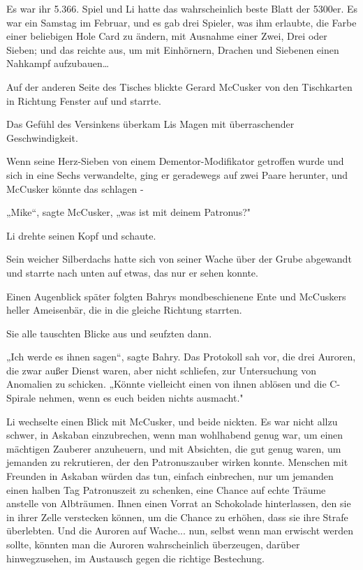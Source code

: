 {Es war ihr 5.366. Spiel und Li hatte das wahrscheinlich beste Blatt der 5300er. Es war ein Samstag im Februar, und es gab drei Spieler, was ihm erlaubte, die Farbe einer beliebigen Hole Card zu ändern, mit Ausnahme einer Zwei, Drei oder Sieben; und das reichte aus, um mit Einhörnern, Drachen und Siebenen einen Nahkampf aufzubauen…

Auf der anderen Seite des Tisches blickte Gerard McCusker von den Tischkarten in Richtung Fenster auf und starrte.

Das Gefühl des Versinkens überkam Lis Magen mit überraschender Geschwindigkeit.

Wenn seine Herz-Sieben von einem Dementor-Modifikator getroffen wurde und sich in eine Sechs verwandelte, ging er geradewegs auf zwei Paare herunter, und McCusker könnte das schlagen -

„Mike“, sagte McCusker, „was ist mit deinem Patronus?"

Li drehte seinen Kopf und schaute.

Sein weicher Silberdachs hatte sich von seiner Wache über der Grube abgewandt und starrte nach unten auf etwas, das nur er sehen konnte.

Einen Augenblick später folgten Bahrys mondbeschienene Ente und McCuskers heller Ameisenbär, die in die gleiche Richtung starrten.

Sie alle tauschten Blicke aus und seufzten dann.

„Ich werde es ihnen sagen“, sagte Bahry. Das Protokoll sah vor, die drei Auroren, die zwar außer Dienst waren, aber nicht schliefen, zur Untersuchung von Anomalien zu schicken. „Könnte vielleicht einen von ihnen ablösen und die C-Spirale nehmen, wenn es euch beiden nichts ausmacht."

Li wechselte einen Blick mit McCusker, und beide nickten. Es war nicht allzu schwer, in Askaban einzubrechen, wenn man wohlhabend genug war, um einen mächtigen Zauberer anzuheuern, und mit Absichten, die gut genug waren, um jemanden zu rekrutieren, der den Patronuszauber wirken konnte. Menschen mit Freunden in Askaban würden das tun, einfach einbrechen, nur um jemanden einen halben Tag Patronuszeit zu schenken, eine Chance auf echte Träume anstelle von Albträumen. Ihnen einen Vorrat an Schokolade hinterlassen, den sie in ihrer Zelle verstecken können, um die Chance zu erhöhen, dass sie ihre Strafe überlebten. Und die Auroren auf Wache... nun, selbst wenn man erwischt werden sollte, könnten man die Auroren wahrscheinlich überzeugen, darüber hinwegzusehen, im Austausch gegen die richtige Bestechung.

}

